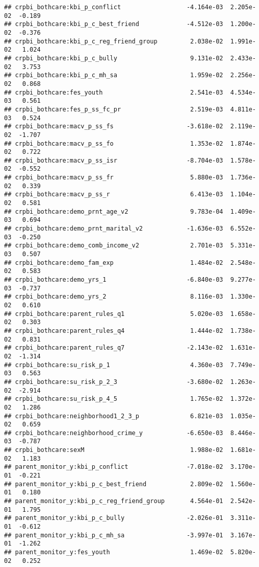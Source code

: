 \documentclass[
]{article}
\begin{document}
\begin{verbatim}
## crpbi_bothcare:kbi_p_conflict                  -4.164e-03  2.205e-02  -0.189
## crpbi_bothcare:kbi_p_c_best_friend             -4.512e-03  1.200e-02  -0.376
## crpbi_bothcare:kbi_p_c_reg_friend_group         2.038e-02  1.991e-02   1.024
## crpbi_bothcare:kbi_p_c_bully                    9.131e-02  2.433e-02   3.753
## crpbi_bothcare:kbi_p_c_mh_sa                    1.959e-02  2.256e-02   0.868
## crpbi_bothcare:fes_youth                        2.541e-03  4.534e-03   0.561
## crpbi_bothcare:fes_p_ss_fc_pr                   2.519e-03  4.811e-03   0.524
## crpbi_bothcare:macv_p_ss_fs                    -3.618e-02  2.119e-02  -1.707
## crpbi_bothcare:macv_p_ss_fo                     1.353e-02  1.874e-02   0.722
## crpbi_bothcare:macv_p_ss_isr                   -8.704e-03  1.578e-02  -0.552
## crpbi_bothcare:macv_p_ss_fr                     5.880e-03  1.736e-02   0.339
## crpbi_bothcare:macv_p_ss_r                      6.413e-03  1.104e-02   0.581
## crpbi_bothcare:demo_prnt_age_v2                 9.783e-04  1.409e-03   0.694
## crpbi_bothcare:demo_prnt_marital_v2            -1.636e-03  6.552e-03  -0.250
## crpbi_bothcare:demo_comb_income_v2              2.701e-03  5.331e-03   0.507
## crpbi_bothcare:demo_fam_exp                     1.484e-02  2.548e-02   0.583
## crpbi_bothcare:demo_yrs_1                      -6.840e-03  9.277e-03  -0.737
## crpbi_bothcare:demo_yrs_2                       8.116e-03  1.330e-02   0.610
## crpbi_bothcare:parent_rules_q1                  5.020e-03  1.658e-02   0.303
## crpbi_bothcare:parent_rules_q4                  1.444e-02  1.738e-02   0.831
## crpbi_bothcare:parent_rules_q7                 -2.143e-02  1.631e-02  -1.314
## crpbi_bothcare:su_risk_p_1                      4.360e-03  7.749e-03   0.563
## crpbi_bothcare:su_risk_p_2_3                   -3.680e-02  1.263e-02  -2.914
## crpbi_bothcare:su_risk_p_4_5                    1.765e-02  1.372e-02   1.286
## crpbi_bothcare:neighborhood1_2_3_p              6.821e-03  1.035e-02   0.659
## crpbi_bothcare:neighborhood_crime_y            -6.650e-03  8.446e-03  -0.787
## crpbi_bothcare:sexM                             1.988e-02  1.681e-02   1.183
## parent_monitor_y:kbi_p_conflict                -7.018e-02  3.170e-01  -0.221
## parent_monitor_y:kbi_p_c_best_friend            2.809e-02  1.560e-01   0.180
## parent_monitor_y:kbi_p_c_reg_friend_group       4.564e-01  2.542e-01   1.795
## parent_monitor_y:kbi_p_c_bully                 -2.026e-01  3.311e-01  -0.612
## parent_monitor_y:kbi_p_c_mh_sa                 -3.997e-01  3.167e-01  -1.262
## parent_monitor_y:fes_youth                      1.469e-02  5.820e-02   0.252

\end{verbatim}
\end{document}
